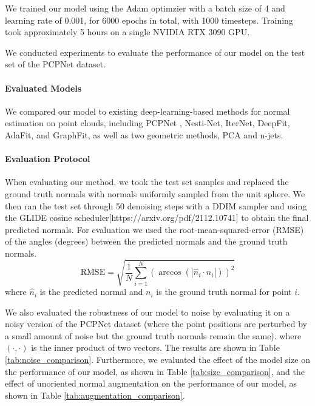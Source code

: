 \documentclass{acmart}
\begin{document}
We trained our model using the Adam optimzier with a batch size of 4 and learning rate of 0.001, for 6000 epochs in total, with 1000 timesteps. Training took approximately 5 hours on a single NVIDIA RTX 3090 GPU.

We conducted experiments to evaluate the performance of our model on the test set of the PCPNet dataset.

\paragraph{Evaluated Models}
We compared our model to existing deep-learning-based methods for normal estimation on point clouds, including PCPNet \cite{guerrero2018pcpnet}, Nesti-Net, IterNet, DeepFit, AdaFit, and GraphFit, as well as two geometric methods, PCA and n-jets.
\paragraph{Evaluation Protocol}
When evaluating our method, we took the test set samples and replaced the ground truth normals with normals uniformly sampled from the unit sphere. We then ran the test set through 50 denoising steps with a DDIM sampler and using the GLIDE cosine scheduler[https://arxiv.org/pdf/2112.10741] to obtain the final predicted normals.
For evaluation we used the root-mean-squared-error (RMSE) of the angles (degrees) between the predicted normals and the ground truth normals.
\begin{equation}
    \text{RMSE} = \sqrt{\frac{1}{N}\sum_{i=1}^{N}(\arccos(|\hat{n}_i \cdot n_i|))^2}
\end{equation}
where $\hat{n}_i$ is the predicted normal and $n_i$ is the ground truth normal for point $i$.

We also evaluated the robustness of our model to noise by evaluating it on a noisy version of the PCPNet dataset (where the point positions are perturbed by a small amount of noise but the ground truth normals remain the same). where $(\cdot, \cdot)$ is the inner product of two vectors. The results are shown in Table \ref{tab:noise_comparison}. Furthermore, we evaluated the effect of the model size on the performance of our model, as shown in Table \ref{tab:size_comparison}, and the effect of unoriented normal augmentation on the performance of our model, as shown in Table \ref{tab:augmentation_comparison}.
\end{document}

